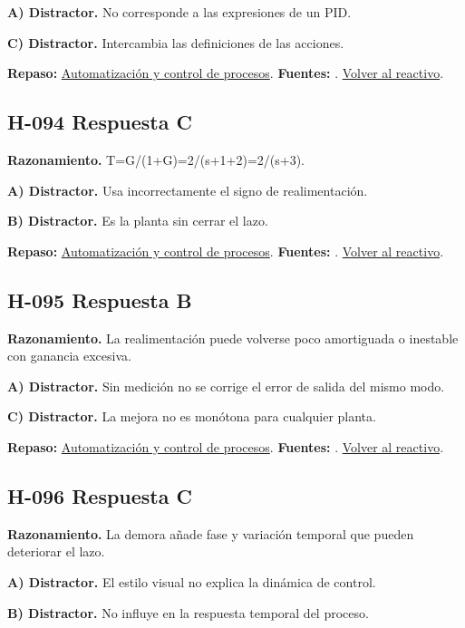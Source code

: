 \textbf{A) Distractor. }No corresponde a las expresiones de un PID.

\textbf{C) Distractor. }Intercambia las definiciones de las acciones.

\textbf{Repaso:} \hyperref[sec:h4]{Automatización y control de procesos}. \textbf{Fuentes:} \cite{control,signals,pid}. \hyperref[q:H-093]{Volver al reactivo}.\par\medskip

\subsection*{H-094 \quad Respuesta C}\label{s:H-094}
\textbf{Razonamiento.} T=G/(1+G)=2/(s+1+2)=2/(s+3).

\textbf{A) Distractor. }Usa incorrectamente el signo de realimentación.

\textbf{B) Distractor. }Es la planta sin cerrar el lazo.

\textbf{Repaso:} \hyperref[sec:h4]{Automatización y control de procesos}. \textbf{Fuentes:} \cite{control,signals,pid}. \hyperref[q:H-094]{Volver al reactivo}.\par\medskip

\subsection*{H-095 \quad Respuesta B}\label{s:H-095}
\textbf{Razonamiento.} La realimentación puede volverse poco amortiguada o inestable con ganancia excesiva.

\textbf{A) Distractor. }Sin medición no se corrige el error de salida del mismo modo.

\textbf{C) Distractor. }La mejora no es monótona para cualquier planta.

\textbf{Repaso:} \hyperref[sec:h4]{Automatización y control de procesos}. \textbf{Fuentes:} \cite{control,signals,pid}. \hyperref[q:H-095]{Volver al reactivo}.\par\medskip

\subsection*{H-096 \quad Respuesta C}\label{s:H-096}
\textbf{Razonamiento.} La demora añade fase y variación temporal que pueden deteriorar el lazo.

\textbf{A) Distractor. }El estilo visual no explica la dinámica de control.

\textbf{B) Distractor. }No influye en la respuesta temporal del proceso.

